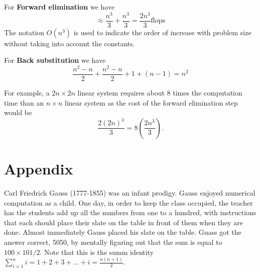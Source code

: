 \documentclass [titlepage,12pt,letter] {article}
\begin{document}
For {\bf Forward elimination} we have
\[
\approx \frac{n^3}{3} + \frac{n^3}{3} = \frac{2n^3}{3} \mbox{flops} 
\] 
\noindent 
The notation $O(n^3)$ is used to indicate the order of increase with problem size without taking into account the constants. 

For {\bf Back substitution} we have 
\[
\frac{n^2 - n}{2} + \frac{n^2-n}{2} + 1 + (n-1) = n^2 
\]

For example, a $2n \times 2n$ linear system requires about 8 times the computation time than an $n \times n$ linear system 
as the cost of the forward elimination step would be 
\[
\frac{2(2n)^3}{3} = 8(\frac{2n^3}{3}).
\]

\section*{Appendix} 

Carl Friedrich Gauss (1777-1855) was an infant prodigy. Gauss enjoyed numerical computation as a child. One day, in order to keep
the class occupied, the teacher has the students add up all the numbers from one to a hundred, with instructions that each should place their slate
on the table in front of them when they are done. Almost immediately Gauss placed his slate on the table. Guass got the answer correct, 5050, by mentally
figuring out that the sum is equal to $100 \times 101/2$. Note that this is the summ identity $\sum_{i=1}^{n} i = 1 + 2 + 3 + \dots + i = \frac{n(n+1)}{2}$.
\end{document}
